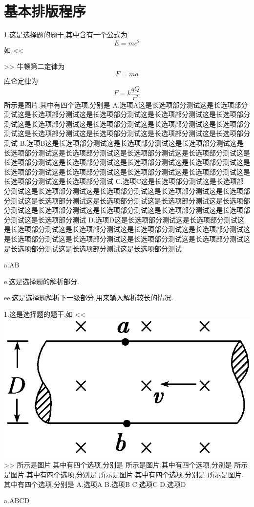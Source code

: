 \documentclass[a4paper,fontset = windowsnew]{ctexbook}
\begin{document}
\chapter{基本排版程序}



\begin{choices}
  1.这是选择题的题干,其中含有一个公式为
  \[E=mc^2\]
  如
  <<
  >>
  牛顿第二定律为
  $$F=ma$$
  库仑定律为
  \begin{equation}
     F=k\frac{qQ}{r^2}
  \end{equation}
  所示是图片.其中有四个选项,分别是
  A.选项A这是长选项部分测试这是长选项部分测试这是长选项部分测试这是长选项部分测试这是长选项部分测试这是长选项部分测试这是长选项部分测试这是长选项部分测试这是长选项部分测试这是长选项部分测试这是长选项部分测试这是长选项部分测试这是长选项部分测试这是长选项部分测试
  B.选项B这是长选项部分测试这是长选项部分测试这是长选项部分测试这是长选项部分测试这是长选项部分测试这是长选项部分测试这是长选项部分测试这是长选项部分测试这是长选项部分测试这是长选项部分测试这是长选项部分测试这是长选项部分测试这是长选项部分测试这是长选项部分测试这是长选项部分测试这是长选项部分测试这是长选项部分测试
  C.选项C这是长选项部分测试这是长选项部分测试这是长选项部分测试这是长选项部分测试这是长选项部分测试这是长选项部分测试这是长选项部分测试这是长选项部分测试这是长选项部分测试这是长选项部分测试这是长选项部分测试这是长选项部分测试这是长选项部分测试这是长选项部分测试这是长选项部分测试
  D.选项D这是长选项部分测试这是长选项部分测试这是长选项部分测试这是长选项部分测试这是长选项部分测试这是长选项部分测试这是长选项部分测试这是长选项部分测试这是长选项部分测试这是长选项部分测试这是长选项部分测试这是长选项部分测试这是长选项部分测试

  a.AB

  e.这是选择题的解析部分.

  ee.这是选择题解析下一级部分,用来输入解析较长的情况.

  1.这是选择题的题干,如
  <<
  \includegraphics{1.png}
  >>
  所示是图片.其中有四个选项,分别是
  所示是图片.其中有四个选项,分别是
  所示是图片.其中有四个选项,分别是
  所示是图片.其中有四个选项,分别是
  所示是图片.其中有四个选项,分别是
  A.选项A
  B.选项B
  C.选项C
  D.选项D

  a.ABCD


\end{choices}
\end{document}
